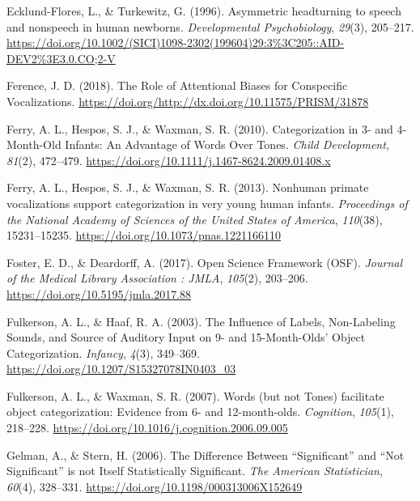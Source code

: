 \documentclass[
  man]{apa6}
\begin{document}
\leavevmode\hypertarget{ref-ecklund-flores_asymmetric_1996}{}%
Ecklund-Flores, L., \& Turkewitz, G. (1996). Asymmetric headturning to speech and nonspeech in human newborns. \emph{Developmental Psychobiology}, \emph{29}(3), 205--217. \url{https://doi.org/10.1002/(SICI)1098-2302(199604)29:3\%3C205::AID-DEV2\%3E3.0.CO;2-V}

\leavevmode\hypertarget{ref-ference_role_2018}{}%
Ference, J. D. (2018). The Role of Attentional Biases for Conspecific Vocalizations. \url{https://doi.org/http://dx.doi.org/10.11575/PRISM/31878}

\leavevmode\hypertarget{ref-ferry_categorization_2010}{}%
Ferry, A. L., Hespos, S. J., \& Waxman, S. R. (2010). Categorization in 3- and 4-Month-Old Infants: An Advantage of Words Over Tones. \emph{Child Development}, \emph{81}(2), 472--479. \url{https://doi.org/10.1111/j.1467-8624.2009.01408.x}

\leavevmode\hypertarget{ref-ferry_nonhuman_2013}{}%
Ferry, A. L., Hespos, S. J., \& Waxman, S. R. (2013). Nonhuman primate vocalizations support categorization in very young human infants. \emph{Proceedings of the National Academy of Sciences of the United States of America}, \emph{110}(38), 15231--15235. \url{https://doi.org/10.1073/pnas.1221166110}

\leavevmode\hypertarget{ref-foster_open_2017}{}%
Foster, E. D., \& Deardorff, A. (2017). Open Science Framework (OSF). \emph{Journal of the Medical Library Association : JMLA}, \emph{105}(2), 203--206. \url{https://doi.org/10.5195/jmla.2017.88}

\leavevmode\hypertarget{ref-fulkerson_influence_2003}{}%
Fulkerson, A. L., \& Haaf, R. A. (2003). The Influence of Labels, Non-Labeling Sounds, and Source of Auditory Input on 9- and 15-Month-Olds' Object Categorization. \emph{Infancy}, \emph{4}(3), 349--369. \url{https://doi.org/10.1207/S15327078IN0403_03}

\leavevmode\hypertarget{ref-fulkerson_words_2007}{}%
Fulkerson, A. L., \& Waxman, S. R. (2007). Words (but not Tones) facilitate object categorization: Evidence from 6- and 12-month-olds. \emph{Cognition}, \emph{105}(1), 218--228. \url{https://doi.org/10.1016/j.cognition.2006.09.005}

\leavevmode\hypertarget{ref-gelman_difference_2006}{}%
Gelman, A., \& Stern, H. (2006). The Difference Between ``Significant'' and ``Not Significant'' is not Itself Statistically Significant. \emph{The American Statistician}, \emph{60}(4), 328--331. \url{https://doi.org/10.1198/000313006X152649}
\end{document}
